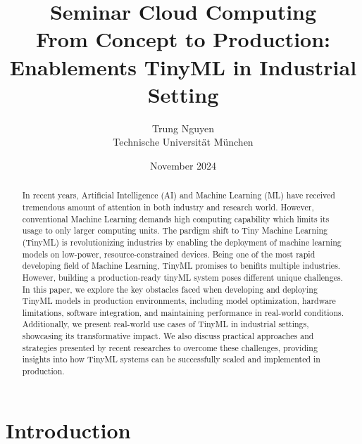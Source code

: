 \documentclass[twocolumn]{article}
\author{Trung Nguyen\\ Technische Universit\"at M\"unchen}
\title{Seminar Cloud Computing \\
       {\bf From Concept to Production: Enablements TinyML in Industrial Setting}
}
\date{November 2024}
\begin{document}
\maketitle

\begin{abstract}
In recent years, Artificial Intelligence (AI) and Machine Learning (ML) have received tremendous amount of attention in both industry and research world. However, conventional Machine Learning demands high computing capability which limits its usage to only larger computing units. The pardigm shift to Tiny Machine Learning (TinyML) is revolutionizing industries by enabling the deployment of machine learning models on low-power, resource-constrained devices. Being one of the most rapid developing field of Machine Learning, TinyML promises to benifits multiple industries. However, building a production-ready tinyML system poses different unique challenges. In this paper, we explore the key obstacles faced when developing and deploying TinyML models in production environments, including model optimization, hardware limitations, software integration, and maintaining performance in real-world conditions. Additionally, we present real-world use cases of TinyML in industrial settings, showcasing its transformative impact. We also discuss practical approaches and strategies presented by recent researches \cite{ren_tinyol_2021} to overcome these challenges, providing insights into how TinyML systems can be successfully scaled and implemented in production.
\end{abstract}

\section{Introduction}
\label{introduction}
\end{document}
